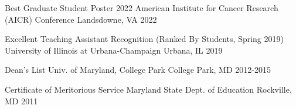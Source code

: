 




\begin{cvhonors}

  \cvhonor
    {Best Graduate Student Poster} %
    {2022 American Institute for Cancer Research (AICR) Conference} %
    {Landsdowne, VA} %
    {2022} %


  \cvhonor
    {Excellent Teaching Assistant Recognition (Ranked By Students, Spring 2019)} %
    {University of Illinois at Urbana-Champaign} %
    {Urbana, IL} %
    {2019} %

  \cvhonor
    {Dean’s List} %
    {Univ. of Maryland, College Park} %
    {College Park, MD} %
    {2012-2015} %

  \cvhonor
    {Certificate of Meritorious Service} %
    {Maryland State Dept. of Education} %
    {Rockville, MD} %
    {2011} %


\end{cvhonors}

